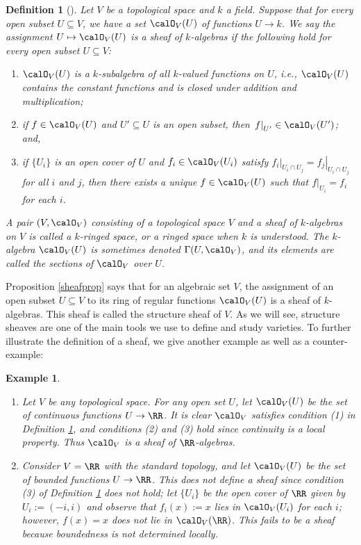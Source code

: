 \documentclass[12pt]{amsart}
\theoremstyle{plain}
\newtheorem{definition}[theorem]{Definition}
\newtheorem{example}[theorem]{Example}
\begin{document}
\begin{definition}[{\cite[Chapter 3, a.]{Milne13}}]\label{sheafdef}
Let $V$ be a topological space and $k$ a field.
Suppose that for every open subset $U \subseteq V$, we have a set $\calO_V(U)$ of functions $U \to k$.
We say the assignment $U \mapsto \calO_V(U)$ is a sheaf of $k$-algebras if the following hold for every open subset $U \subseteq V$:
\begin{enumerate}
\item
$\calO_V(U)$ is a $k$-subalgebra of all $k$-valued functions on $U$, i.e., $\calO_V(U)$ contains the constant functions and is closed under addition and multiplication;
\item
if $f \in \calO_V(U)$ and $U'\subseteq U$ is an open subset, then $\left. f \right|_{U'} \in \calO_V(U')$; and,
\item
if $\{U_i\}$ is an open cover of $U$ and $f_i \in \calO_V(U_i)$ satisfy $\left. f_i \right|_{U_i \cap U_j} = \left. f_j \right|_{U_i \cap U_j}$ for all $i$ and $j$, then there exists a unique $f \in \calO_V(U)$ such that $\left. f\right|_{U_i} = f_i$ for each $i$.
\end{enumerate}
A pair $(V, \calO_V)$ consisting of a topological space $V$ and a sheaf of $k$-algebras on $V$ is called a $k$-ringed space, or a ringed space when $k$ is understood.
The $k$-algebra $\calO_V(U)$ is sometimes denoted $\Gamma(U, \calO_V)$, and its elements are called the sections of $\calO_V$ over $U$.
\end{definition}

Proposition \ref{sheafprop} says that for an algebraic set $V$, the assignment of an open subset $U \subseteq V$ to its ring of regular functions $\calO_V(U)$ is a sheaf of $k$-algebras.
This sheaf is called the structure sheaf of $V$.
As we will see, structure sheaves are one of the main tools we use to define and study varieties.
To further illustrate the definition of a sheaf, we give another example as well as a counter-example:

\begin{example}
\begin{enumerate}
\item
Let $V$ be any topological space.
For any open set $U$, let $\calO_V(U)$ be the set of continuous functions $U \to \RR$.
It is clear $\calO_V$ satisfies condition (1) in Definition \ref{sheafdef}, and conditions (2) and (3) hold since continuity is a local property. Thus $\calO_V$ is a sheaf of $\RR$-algebras.

\item
Consider $V = \RR$ with the standard topology, and let $\calO_V(U)$ be the set of bounded functions $U \to \RR$.
This does not define a sheaf since condition (3) of Definition \ref{sheafdef} does not hold;
let $\{U_i\}$ be the open cover of $\RR$ given by $U_i:=(-i, i)$ and observe that $f_i(x):=x$ lies in $\calO_V(U_i)$ for each $i$;
however, $f(x) = x$ does not lie in $\calO_V(\RR)$.
This fails to be a sheaf because boundedness is not determined locally.
\end{enumerate}
\end{example}
\end{document}
